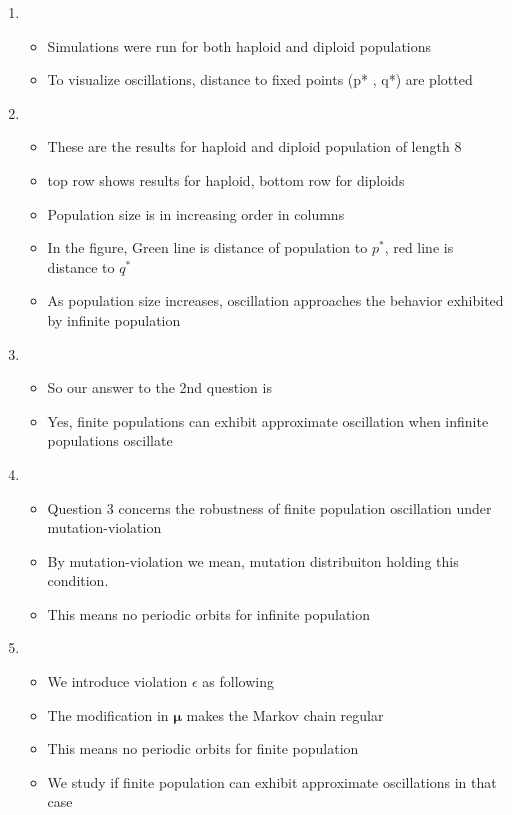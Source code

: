 \documentclass{article}
\begin{document}
\begin{enumerate}
\item
  \begin{itemize}
  \item Simulations were run for both haploid and diploid populations
  \item To visualize oscillations, distance to fixed points (p* , q*) are plotted
  \end{itemize}
    
\item
  \begin{itemize}
  \item These are the results for haploid and diploid population of
    length 8
   \item top row shows results for haploid, bottom row for diploids
  \item Population size is in increasing order in columns
  \item In the figure, Green line is distance of population to $p^\ast$, red line is distance to $q^\ast$
  \item As population size increases, oscillation approaches the
    behavior exhibited by infinite population
  \end{itemize}
    
    
\item
  \begin{itemize}
  \item So our answer to the 2nd question is
   \item Yes, finite populations can exhibit approximate oscillation when infinite populations oscillate
  \end{itemize}
  
\item
  \begin{itemize}
  \item Question 3 concerns the robustness of finite population oscillation under mutation-violation
  \item By mutation-violation we mean, mutation distribuiton holding this condition.
  \item This means no periodic orbits for infinite population
  \end{itemize}

\item
  \begin{itemize}
  \item We introduce violation $\epsilon$ as following
  \item The modification in $\bm{\mu}$ makes the Markov chain regular 
  \item This means no periodic orbits for finite population  
  \item We study if finite population can exhibit approximate oscillations in that case 
  \end{itemize}
  

\end{enumerate}
\end{document}
